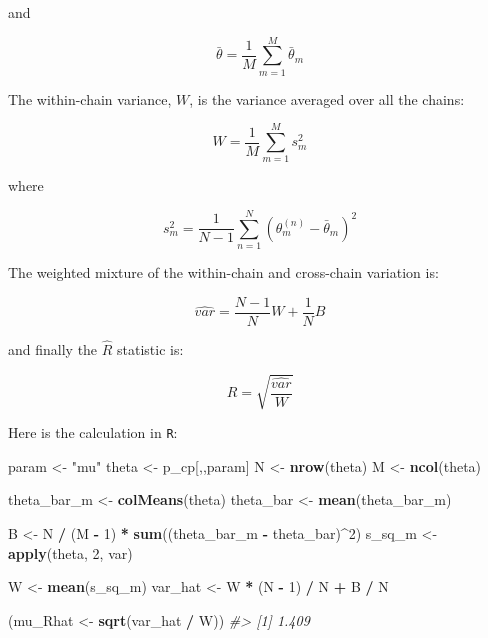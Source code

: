 \documentclass[11pt, oneside, openany]{scrbook}
\newenvironment{Shaded}{\begin{snugshade}}{\end{snugshade}}
\newcommand{\CommentTok}[1]{\textcolor[rgb]{0.56,0.35,0.01}{\textit{#1}}}
\newcommand{\DecValTok}[1]{\textcolor[rgb]{0.00,0.00,0.81}{#1}}
\newcommand{\KeywordTok}[1]{\textcolor[rgb]{0.13,0.29,0.53}{\textbf{#1}}}
\newcommand{\NormalTok}[1]{#1}
\newcommand{\OperatorTok}[1]{\textcolor[rgb]{0.81,0.36,0.00}{\textbf{#1}}}
\newcommand{\StringTok}[1]{\textcolor[rgb]{0.31,0.60,0.02}{#1}}
\begin{document}
and

\[
\bar{\theta} = \frac{1}{M}\sum_{m=1}^{M}\bar{\theta}_m
\]

The within-chain variance, \(W\), is the variance averaged over all the chains:

\[
W = \frac{1}{M}\sum_{m=1}^{M} s_{m}^2
\]

where

\[
s_{m}^2 = \frac{1}{N-1}\sum_{n=1}^{N}\left(\theta_{m}^{(n)} - \bar{\theta}_m\right)^2
\]

The weighted mixture of the within-chain and cross-chain variation is:


\[
\hat{var} = \frac{N-1}{N} W + \frac{1}{N} B
\]

and finally the \(\hat{R}\) statistic is:

\[
\hat{R} = \sqrt{\frac{\hat{var}}{W}}
\]

Here is the calculation in \texttt{R}:

\begin{Shaded}
\begin{Highlighting}[]
\NormalTok{param <-}\StringTok{ "mu"}
\NormalTok{theta <-}\StringTok{ }\NormalTok{p_cp[,,param]}
\NormalTok{N     <-}\StringTok{ }\KeywordTok{nrow}\NormalTok{(theta)}
\NormalTok{M     <-}\StringTok{ }\KeywordTok{ncol}\NormalTok{(theta)}

\NormalTok{theta_bar_m <-}\StringTok{ }\KeywordTok{colMeans}\NormalTok{(theta)}
\NormalTok{theta_bar   <-}\StringTok{ }\KeywordTok{mean}\NormalTok{(theta_bar_m)}

\NormalTok{B <-}\StringTok{ }\NormalTok{N }\OperatorTok{/}\StringTok{ }\NormalTok{(M }\OperatorTok{-}\StringTok{ }\DecValTok{1}\NormalTok{) }\OperatorTok{*}\StringTok{ }\KeywordTok{sum}\NormalTok{((theta_bar_m }\OperatorTok{-}\StringTok{ }\NormalTok{theta_bar)}\OperatorTok{^}\DecValTok{2}\NormalTok{)}
\NormalTok{s_sq_m <-}\StringTok{ }\KeywordTok{apply}\NormalTok{(theta, }\DecValTok{2}\NormalTok{, var)}

\NormalTok{W <-}\StringTok{ }\KeywordTok{mean}\NormalTok{(s_sq_m)}
\NormalTok{var_hat <-}\StringTok{ }\NormalTok{W }\OperatorTok{*}\StringTok{ }\NormalTok{(N }\OperatorTok{-}\StringTok{ }\DecValTok{1}\NormalTok{) }\OperatorTok{/}\StringTok{ }\NormalTok{N }\OperatorTok{+}\StringTok{ }\NormalTok{B }\OperatorTok{/}\StringTok{ }\NormalTok{N}

\NormalTok{(mu_Rhat <-}\StringTok{ }\KeywordTok{sqrt}\NormalTok{(var_hat }\OperatorTok{/}\StringTok{ }\NormalTok{W))}
\CommentTok{#> [1] 1.409}
\end{Highlighting}
\end{Shaded}
\end{document}
